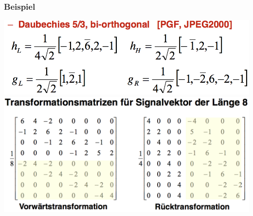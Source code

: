 \documentclass[10pt]{article}
\begin{document}
\subsubsection*{Beispiel}
\begin{center}
	\includegraphics[scale=0.2]{daubechies1.png}
	\includegraphics[scale=0.1]{daubechies2.png}
\end{center}
\end{document}
